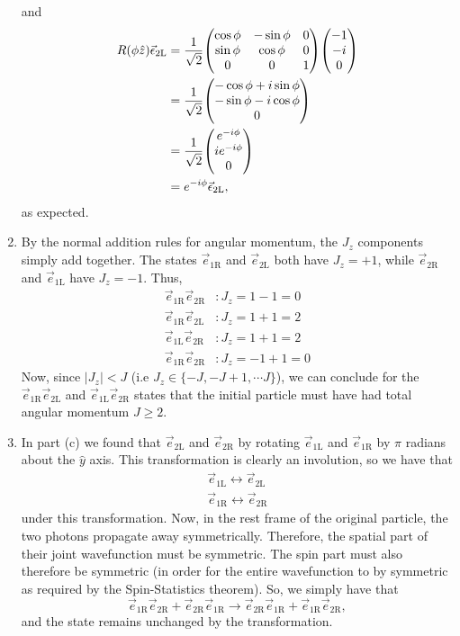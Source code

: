 \documentclass[12pt]{article}
\begin{document}
\begin{enumerate}[label=(\alph*)]
    and
    \begin{align*}
        R(\phi\hat{z})\vec{\epsilon}_{2\text{L}} &= \frac{1}{\sqrt{2}}\mqty(\cos\phi & -\sin\phi & 0 \\ \sin\phi & \cos\phi & 0 \\ 0 & 0 & 1)\mqty(-1\\-i\\0) \\
        &= \frac{1}{\sqrt{2}}\mqty(-\cos\phi + i\sin\phi \\ -\sin\phi - i\cos\phi \\ 0) \\
        &= \frac{1}{\sqrt{2}}\mqty(e^{-i\phi} \\ ie^{-i\phi} \\ 0) \\
        &= e^{-i\phi}\vec{\epsilon}_{2\text{L}},
    \end{align*}
    as expected.

    \item By the normal addition rules for angular momentum, the $J_z$ components simply add together. The states $\vec{e}_{1\text{R}}$ and $\vec{e}_{2\text{L}}$ both have $J_z = +1$, while $\vec{e}_{2\text{R}}$ and $\vec{e}_{1\text{L}}$ have $J_z = -1$. Thus,
    \begin{align*}
        \vec{e}_{1\text{R}}\vec{e}_{2\text{R}}&: J_z = 1-1 = 0 \\
        \vec{e}_{1\text{R}}\vec{e}_{2\text{L}}&: J_z = 1+1 = 2 \\
        \vec{e}_{1\text{L}}\vec{e}_{2\text{R}}&: J_z = 1+1 = 2 \\
        \vec{e}_{1\text{R}}\vec{e}_{2\text{R}}&: J_z = -1+1 = 0
    \end{align*}
    Now, since $|J_z| < J$ (i.e $J_z \in \{-J, -J+1, \cdots J\}$), we can conclude for the $\vec{e}_{1\text{R}}\vec{e}_{2\text{L}}$ and $\vec{e}_{1\text{L}}\vec{e}_{2\text{R}}$ states that the initial particle must have had total angular momentum $J \geq 2$.

    \item In part (c) we found that $\vec{e}_{2\text{L}}$ and $\vec{e}_{2\text{R}}$ by rotating $\vec{e}_{1\text{L}}$ and $\vec{e}_{1\text{R}}$ by $\pi$ radians about the $\hat{y}$ axis. This transformation is clearly an involution, so we have that
    \begin{align*}
        \vec{e}_{1\text{L}} \leftrightarrow \vec{e}_{2\text{L}} \\
        \vec{e}_{1\text{R}} \leftrightarrow \vec{e}_{2\text{R}}
    \end{align*}
    under this transformation. Now, in the rest frame of the original particle, the two photons propagate away symmetrically. Therefore, the spatial part of their joint wavefunction must be symmetric. The spin part must also therefore be symmetric (in order for the entire wavefunction to by symmetric as required by the Spin-Statistics theorem). So, we simply have that
    \[ \vec{e}_{1\text{R}}\vec{e}_{2\text{R}} + \vec{e}_{2\text{R}}\vec{e}_{1\text{R}} \to \vec{e}_{2\text{R}}\vec{e}_{1\text{R}} + \vec{e}_{1\text{R}}\vec{e}_{2\text{R}},  \]
    and the state remains unchanged by the transformation.


\end{enumerate}
\end{document}
